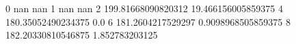 0 nan nan
1 nan nan
2 199.81668090820312 19.466156005859375
4 180.35052490234375 0.0
6 181.2604217529297 0.9098968505859375
8 182.20330810546875 1.852783203125
